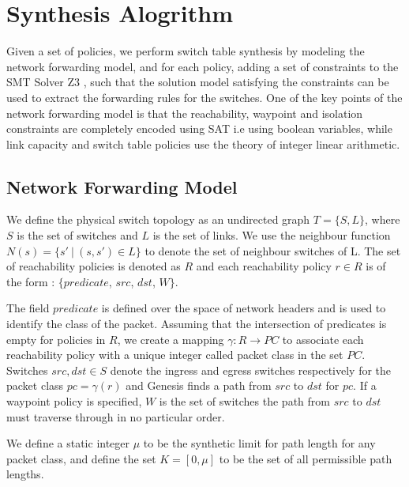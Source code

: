 \section{Synthesis Alogrithm}
Given a set of policies, we perform switch table synthesis by modeling the network forwarding model, and for each policy, adding a set of constraints to the SMT Solver Z3 \cite{z3}, such that the solution model satisfying the constraints can be used to extract the forwarding rules for the switches. One of the key points of the network forwarding model is that the reachability, waypoint and isolation constraints are completely encoded using SAT i.e using boolean variables, while link capacity and switch table policies use the theory of integer linear arithmetic.
\subsection{Network Forwarding Model} \label{sec:fwdmodel}
We define the physical switch topology as an undirected graph $T=\{S, L\}$, where $S$ is the set of switches and $L$ is the set of links. We use the neighbour function $N(s) = \{s'\ | \ (s,s') \in L \}$ to denote the set of neighbour switches of L. The set of reachability policies is denoted as $R$ and each reachability policy $r \in R$ is of the form : $\{predicate$, $src$, $dst$, $W\}$. 

The field $predicate$ is defined over the space of network headers and is used to identify the class of the packet. Assuming that the intersection of predicates is empty for policies in $R$, we create a mapping $\gamma : R \rightarrow PC$ to associate each reachability policy with a unique integer called packet class in the set $PC$. Switches $src, dst \in S$ denote the ingress and egress switches respectively for the packet class $pc = \gamma(r)$ and Genesis finds a path from $src$ to $dst$ for $pc$. If a waypoint policy is specified, $W$ is the set of switches the path from $src$ to $dst$ must traverse through in no particular order.

We define a static integer $\mu$ to be the synthetic limit for path length for any packet class, and define the set $K = [0, \mu]$ to be the set of all permissible path lengths.

